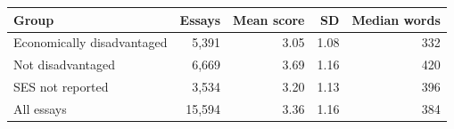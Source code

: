 \begin{tabular}{lrrrr}
\toprule
Group & Essays & Mean score & SD & Median words \\
\midrule
Economically disadvantaged & 5,391 & 3.05 & 1.08 & 332 \\
Not disadvantaged & 6,669 & 3.69 & 1.16 & 420 \\
SES not reported & 3,534 & 3.20 & 1.13 & 396 \\
\midrule
All essays & 15,594 & 3.36 & 1.16 & 384 \\
\bottomrule
\end{tabular}
